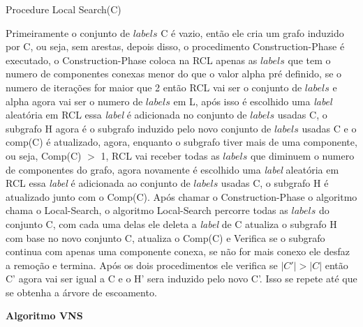 \documentclass[12pt]{article}
\begin{document}
	\begin{algorithm}[H]
		\caption{Procedure Local Search(C)}
	\end{algorithm}
	Primeiramente o conjunto de $labels$ C é vazio, então ele cria um grafo induzido por C, ou seja, sem arestas, depois disso, o procedimento Construction-Phase é executado, o Construction-Phase coloca na RCL apenas as $labels$ que tem o numero de componentes conexas menor do que o valor alpha pré definido, se o numero de iterações for maior que 2 então RCL vai ser o conjunto de $labels$ e alpha agora vai ser o numero de $labels$ em L, após isso é escolhido uma \textit{label} aleatória em RCL essa \textit{label} é adicionada no conjunto de $labels$ usadas C, o subgrafo H agora é o subgrafo induzido pelo novo conjunto de $labels$ usadas C e o comp(C) é atualizado, agora, enquanto o subgrafo tiver mais de uma componente, ou seja, Comp(C) $>$ 1, RCL vai receber todas as $labels$ que diminuem o numero de componentes do grafo, agora novamente é escolhido uma \textit{label} aleatória em RCL essa \textit{label} é adicionada ao conjunto de $labels$ usadas C, o subgrafo H é atualizado junto com o Comp(C). Após chamar o Construction-Phase o algoritmo chama o Local-Search, o algoritmo Local-Search percorre todas as $labels$ do conjunto C, com cada uma delas ele deleta a \textit{label} de C atualiza o subgrafo H com base no novo conjunto C, atualiza o Comp(C) e Verifica se o subgrafo continua com apenas uma componente conexa, se não for mais conexo ele desfaz a remoção e termina.
	Após os dois procedimentos ele verifica se $|C'|>|C|$ então C' agora vai ser igual a C e o H' sera induzido pelo novo C'. Isso se repete até que se obtenha a árvore de escoamento. 


	\noindent\textbf{Algoritmo VNS}\\
\end{document}
